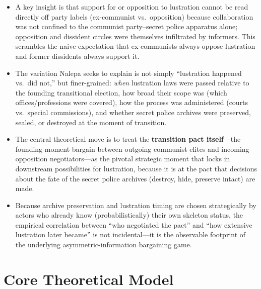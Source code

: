 \documentclass[12pt]{article}
\begin{document}
\begin{itemize}[leftmargin=*, itemsep=4pt]
    \item A key insight is that support for or opposition to lustration cannot be read directly off party labels (ex-communist vs.\ opposition) because collaboration was not confined to the communist party--secret police apparatus alone; opposition and dissident circles were themselves infiltrated by informers. This scrambles the naive expectation that ex-communists always oppose lustration and former dissidents always support it.
    \item The variation Nalepa seeks to explain is not simply ``lustration happened vs.\ did not,'' but finer-grained: \emph{when} lustration laws were passed relative to the founding transitional election, how broad their scope was (which offices/professions were covered), how the process was administered (courts vs.\ special commissions), and whether secret police archives were preserved, sealed, or destroyed at the moment of transition.
    \item The central theoretical move is to treat the \textbf{transition pact itself}---the founding-moment bargain between outgoing communist elites and incoming opposition negotiators---as the pivotal strategic moment that locks in downstream possibilities for lustration, because it is at the pact that decisions about the fate of the secret police archives (destroy, hide, preserve intact) are made.
    \item Because archive preservation and lustration timing are chosen strategically by actors who already know (probabilistically) their own skeleton status, the empirical correlation between ``who negotiated the pact'' and ``how extensive lustration later became'' is not incidental---it is the observable footprint of the underlying asymmetric-information bargaining game.
\end{itemize}

\section{Core Theoretical Model}
\end{document}
